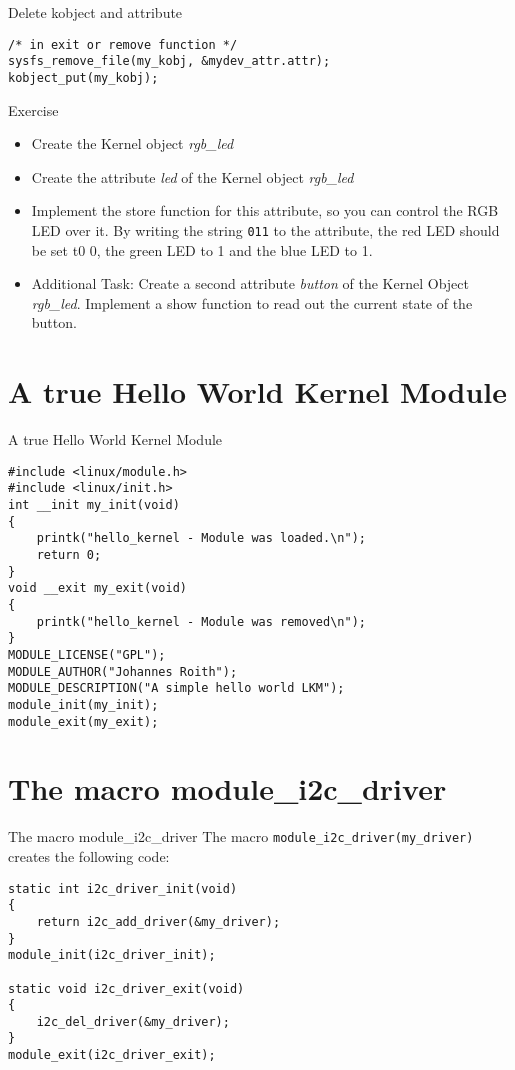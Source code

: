 \documentclass[aspectratio=169]{beamer}
\begin{document}
\begin{frame}[fragile]{Delete kobject and attribute}
	\begin{lstlisting}
/* in exit or remove function */
sysfs_remove_file(my_kobj, &mydev_attr.attr);
kobject_put(my_kobj);
	\end{lstlisting}
\end{frame}

\begin{frame}{Exercise}
	\begin{itemize}	
		\item Create the Kernel object \textit{rgb\_led}
		\item Create the attribute \textit{led} of the Kernel object \textit{rgb\_led}
		\item Implement the store function for this attribute, so you can control the RGB LED over it. By writing the string \lstinline|011| to the attribute, the red LED should be set t0 0, the green LED to 1 and the blue LED to 1.
		\item Additional Task: Create a second attribute \textit{button} of the Kernel Object \textit{rgb\_led}. Implement a show function to read out the current state of the button.
	\end{itemize}	
\end{frame}

\section{A true Hello World Kernel Module}
\begin{frame}[fragile]{A true Hello World Kernel Module}
	\begin{lstlisting}
#include <linux/module.h>
#include <linux/init.h>
int __init my_init(void)
{
	printk("hello_kernel - Module was loaded.\n");
	return 0;
}
void __exit my_exit(void)
{
	printk("hello_kernel - Module was removed\n");
}
MODULE_LICENSE("GPL");
MODULE_AUTHOR("Johannes Roith");
MODULE_DESCRIPTION("A simple hello world LKM");
module_init(my_init);
module_exit(my_exit);
	\end{lstlisting}
\end{frame}

\section{The macro module\_i2c\_driver}
\begin{frame}[fragile]{The macro module\_i2c\_driver}
	The macro \lstinline|module_i2c_driver(my_driver)| creates the following code:

	\begin{lstlisting}
static int i2c_driver_init(void)
{
	return i2c_add_driver(&my_driver);
}
module_init(i2c_driver_init);

static void i2c_driver_exit(void)
{
	i2c_del_driver(&my_driver);
}
module_exit(i2c_driver_exit);
	\end{lstlisting}
\end{frame}
\end{document}
